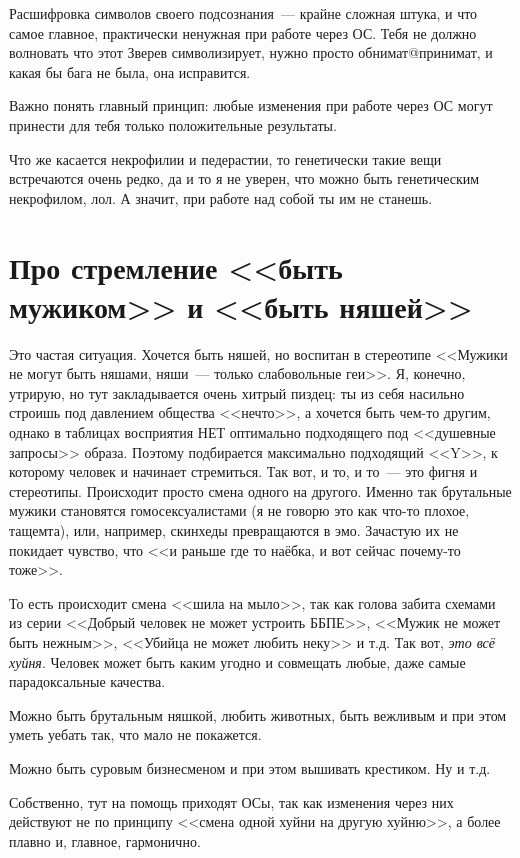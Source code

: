 \documentclass[a4paper,14pt,oneside]{memoir}
\begin{document}
\makeatletter
Расшифровка символов своего подсознания~--- крайне сложная штука, и что самое главное, практически ненужная при работе через ОС. Тебя не должно волновать что этот Зверев символизирует, нужно просто обнимат@принимат, и какая бы бага не была, она исправится.
\makeatother

Важно понять главный принцип: любые изменения при работе через ОС могут принести для тебя только положительные результаты.

Что же касается некрофилии и педерастии, то генетически такие вещи встречаются очень редко, да и то я не уверен, что можно быть генетическим некрофилом, лол. А значит, при работе над собой ты им не станешь. 




\section{Про стремление <<быть мужиком>> и <<быть няшей>>} 
Это частая ситуация. Хочется быть няшей, но воспитан в стереотипе <<Мужики не могут быть няшами, няши~--- только слабовольные геи>>. Я, конечно, утрирую, но тут закладывается очень хитрый пиздец: ты из себя насильно строишь под давлением общества <<нечто>>, а хочется быть чем-то другим, однако в таблицах восприятия НЕТ оптимально подходящего под <<душевные запросы>> образа. Поэтому подбирается максимально подходящий <<Y>>, к которому человек и начинает стремиться. Так вот, и то, и то~--- это фигня и стереотипы. Происходит просто смена одного на другого. Именно так брутальные мужики становятся гомосексуалистами (я не говорю это как что-то плохое, тащемта), или, например, скинхеды превращаются в эмо. Зачастую их не покидает чувство, что <<и раньше где то наёбка, и вот сейчас почему-то тоже>>. 

То есть происходит смена <<шила на мыло>>, так как голова забита схемами из серии <<Добрый человек не может устроить ББПЕ>>, <<Мужик не может быть нежным>>, <<Убийца не может любить неку>> и т.д. Так вот, \textit{это всё хуйня}. Человек может быть каким угодно и совмещать любые, даже самые парадоксальные качества.
 
Можно быть брутальным няшкой, любить животных, быть вежливым и при этом уметь уебать так, что мало не покажется. 

Можно быть суровым бизнесменом и при этом вышивать крестиком. Ну и т.д. 

Собственно, тут на помощь приходят ОСы, так как изменения через них действуют не по принципу <<смена одной хуйни на другую хуйню>>, а более плавно и, главное, гармонично. 
\end{document}
